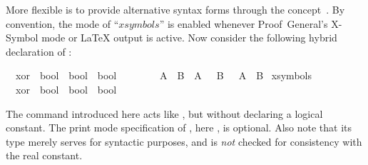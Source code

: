 \begin{isabellebody}
\begin{isamarkuptext}
  \medskip More flexible is to provide alternative syntax forms
  through the  concept~\cite{isabelle-ref}.  By
  convention, the mode of ``$xsymbols$'' is enabled whenever
  Proof~General's X-Symbol mode or {\LaTeX} output is active.  Now
  consider the following hybrid declaration of :%
\end{isamarkuptext}%
\isamarkuptrue%
\isamarkupfalse%
\isamarkupfalse%
\isanewline
\ \ xor\ {\isacharcolon}{\isacharcolon}\ {\isachardoublequote}bool\ {\isasymRightarrow}\ bool\ {\isasymRightarrow}\ bool{\isachardoublequote}\ \ \ \ {\isacharparenleft}\ {\isachardoublequote}{\isacharbrackleft}{\isacharplus}{\isacharbrackright}{\isasymignore}{\isachardoublequote}\ {}{}{\isacharparenright}\isanewline
\ \ {\isachardoublequote}A\ {\isacharbrackleft}{\isacharplus}{\isacharbrackright}{\isasymignore}\ B\ {\isasymequiv}\ {\isacharparenleft}A\ {\isasymand}\ {\isasymnot}\ B{\isacharparenright}\ {\isasymor}\ {\isacharparenleft}{\isasymnot}\ A\ {\isasymand}\ B{\isacharparenright}{\isachardoublequote}\isanewline
\isanewline
\isamarkupfalse%
\ {\isacharparenleft}xsymbols{\isacharparenright}\isanewline
\ \ xor\ {\isacharcolon}{\isacharcolon}\ {\isachardoublequote}bool\ {\isasymRightarrow}\ bool\ {\isasymRightarrow}\ bool{\isachardoublequote}\ \ \ \ {\isacharparenleft}\ {\isachardoublequote}{\isasymoplus}{\isasymignore}{\isachardoublequote}\ {}{}{\isacharparenright}\isamarkupfalse%
\isamarkupfalse%
%
\begin{isamarkuptext}%
The  command introduced here acts like
  , but without declaring a logical constant.  The
  print mode specification of , here , is optional.  Also note that its type merely serves
  for syntactic purposes, and is \emph{not} checked for consistency
  with the real constant.


\end{isamarkuptext}
\end{isabellebody}
